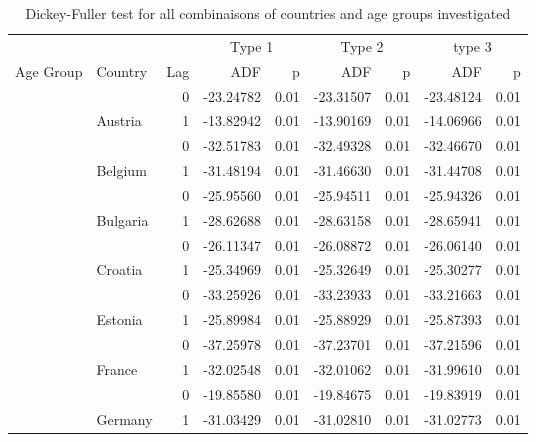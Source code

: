\documentclass[
]{article}
\begin{document}
\begin{table}
\centering
\caption{\label{tab:unnamed-chunk-5}Dickey-Fuller test for all combinaisons of countries and age groups investigated}
\centering
\begin{tabular}[t]{l|l|r|r|r|r|r|r|r}
\hline
\multicolumn{3}{c|}{ } & \multicolumn{2}{c|}{Type 1} & \multicolumn{2}{c|}{Type 2} & \multicolumn{2}{c}{type 3} \\
\cline{4-5} \cline{6-7} \cline{8-9}
Age Group & Country & Lag & ADF & p & ADF & p & ADF & p\\
\hline
 &  & 0 & -23.24782 & 0.01 & -23.31507 & 0.01 & -23.48124 & 0.01\\
\cline{3-9}
 & \multirow{-2}{*}{\raggedright\arraybackslash Austria} & 1 & -13.82942 & 0.01 & -13.90169 & 0.01 & -14.06966 & 0.01\\
\cline{2-9}
 &  & 0 & -32.51783 & 0.01 & -32.49328 & 0.01 & -32.46670 & 0.01\\
\cline{3-9}
 & \multirow{-2}{*}{\raggedright\arraybackslash Belgium} & 1 & -31.48194 & 0.01 & -31.46630 & 0.01 & -31.44708 & 0.01\\
\cline{2-9}
 &  & 0 & -25.95560 & 0.01 & -25.94511 & 0.01 & -25.94326 & 0.01\\
\cline{3-9}
 & \multirow{-2}{*}{\raggedright\arraybackslash Bulgaria} & 1 & -28.62688 & 0.01 & -28.63158 & 0.01 & -28.65941 & 0.01\\
\cline{2-9}
 &  & 0 & -26.11347 & 0.01 & -26.08872 & 0.01 & -26.06140 & 0.01\\
\cline{3-9}
 & \multirow{-2}{*}{\raggedright\arraybackslash Croatia} & 1 & -25.34969 & 0.01 & -25.32649 & 0.01 & -25.30277 & 0.01\\
\cline{2-9}
 &  & 0 & -33.25926 & 0.01 & -33.23933 & 0.01 & -33.21663 & 0.01\\
\cline{3-9}
 & \multirow{-2}{*}{\raggedright\arraybackslash Estonia} & 1 & -25.89984 & 0.01 & -25.88929 & 0.01 & -25.87393 & 0.01\\
\cline{2-9}
 &  & 0 & -37.25978 & 0.01 & -37.23701 & 0.01 & -37.21596 & 0.01\\
\cline{3-9}
 & \multirow{-2}{*}{\raggedright\arraybackslash France} & 1 & -32.02548 & 0.01 & -32.01062 & 0.01 & -31.99610 & 0.01\\
\cline{2-9}
 &  & 0 & -19.85580 & 0.01 & -19.84675 & 0.01 & -19.83919 & 0.01\\
\cline{3-9}
 & \multirow{-2}{*}{\raggedright\arraybackslash Germany} & 1 & -31.03429 & 0.01 & -31.02810 & 0.01 & -31.02773 & 0.01\\

\end{tabular}
\end{table}
\end{document}
